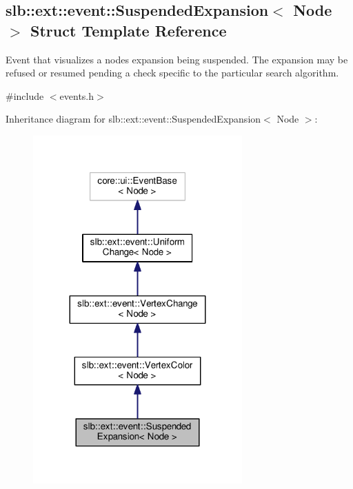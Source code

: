 \hypertarget{structslb_1_1ext_1_1event_1_1SuspendedExpansion}{}\subsection{slb\+:\+:ext\+:\+:event\+:\+:Suspended\+Expansion$<$ Node $>$ Struct Template Reference}
\label{structslb_1_1ext_1_1event_1_1SuspendedExpansion}


Event that visualizes a node\textquotesingle{}s expansion being suspended. The expansion may be refused or resumed pending a check specific to the particular search algorithm.  




{\ttfamily \#include $<$events.\+h$>$}



Inheritance diagram for slb\+:\+:ext\+:\+:event\+:\+:Suspended\+Expansion$<$ Node $>$\+:\nopagebreak
\begin{figure}[H]
\begin{center}
\leavevmode
\includegraphics[width=227pt]{structslb_1_1ext_1_1event_1_1SuspendedExpansion__inherit__graph}
\end{center}
\end{figure}


